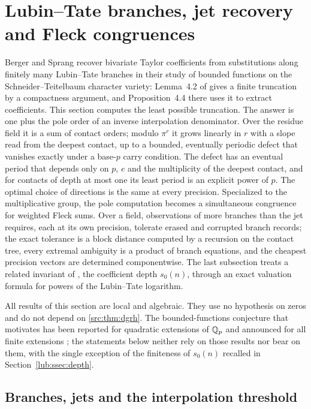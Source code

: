 \section{Lubin--Tate branches, jet recovery and Fleck congruences}\label{sec:lub}

Berger and Sprang recover bivariate Taylor coefficients from substitutions along finitely
many Lubin--Tate branches in their study of bounded functions on the
Schneider--Teitelbaum character variety: Lemma~4.2 of \cite{BergerSprang2025Integer} gives a
finite truncation by a compactness argument, and Proposition~4.4 there uses it to extract
coefficients. This section computes the least possible truncation. The answer is one plus
the pole order of an inverse interpolation denominator. Over the residue field it is a sum
of contact orders; modulo $\pi^r$ it grows linearly in $r$ with a slope read from the
deepest contact, up to a bounded, eventually periodic defect that vanishes exactly under a
base-$p$ carry condition. The defect has an eventual period that depends only on $p$, $e$ and
the multiplicity of the deepest contact, and for contacts of depth at most one its least period
is an explicit power of $p$. The optimal choice of directions is the same at every precision.
Specialized to the multiplicative group, the pole computation becomes a simultaneous
congruence for weighted Fleck sums. Over a field, observations of more branches than the jet
requires, each at its own precision, tolerate erased and corrupted branch records; the exact
tolerance is a block distance computed by a recursion on the contact tree, every extremal
ambiguity is a product of branch equations, and the cheapest precision vectors are determined
componentwise. The last subsection treats a related invariant of
\cite[Definition~5.1]{BergerSprang2025Integer}, the coefficient depth $s_0(n)$, through an
exact valuation formula for powers of the Lubin--Tate logarithm.

All results of this section are local and algebraic. They use no hypothesis on zeros and
do not depend on \cref{src:thm:dgrh}. The bounded-functions conjecture that motivates
\cite{BergerSprang2025Integer} has been reported for quadratic extensions of $\mathbb{Q}_p$
\cite{BergerSprangSteingart2026Bounded} and announced for all finite extensions
\cite{Colovic2026Ring}; the statements below neither rely on those results nor bear on
them, with the single exception of the finiteness of $s_0(n)$ recalled in
Section~\ref{lub:ssec:depth}.

\subsection{Branches, jets and the interpolation threshold}\label{lub:ssec:threshold}
\begingroup\raggedright{}\endgroup

